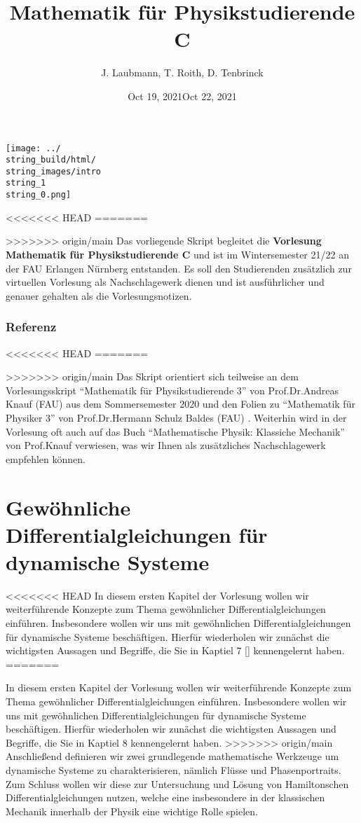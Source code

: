 \documentclass[letterpaper,10pt,english]{jupyterBook}
\title{Mathematik für Physikstudierende C}
\date{Oct 19, 2021}
\date{Oct 22, 2021}
\author{J.\@{} Laubmann, T.\@{} Roith, D.\@{} Tenbrinck}
\begin{document}
\label{\detokenize{intro::doc}}


\noindent\texttt{[image: ../\\string\_build/html/\\string\_images/intro\\string\_1\\string\_0.png]}

<<<<<<< HEAD
=======
\par
>>>>>>> origin/main
Das vorliegende Skript begleitet die \textbf{Vorlesung Mathematik für Physikstudierende C} und ist im Wintersemester 21/22 an der FAU Erlangen Nürnberg entstanden. Es soll den Studierenden zusätzlich zur virtuellen Vorlesung als Nachschlagewerk dienen und ist ausführlicher und genauer gehalten als die Vorlesungsnotizen.

\subsection{Referenz}

<<<<<<< HEAD
=======
\par
>>>>>>> origin/main
Das Skript orientiert sich teilweise an dem Vorlesungsskript “Mathematik für Physikstudierende 3” \cite{Kna20} von Prof.Dr.Andreas Knauf (FAU) aus dem Sommersemester 2020 und den Folien zu “Mathematik für Physiker 3” von Prof.Dr.Hermann Schulz Baldes (FAU) \cite{SB18}. Weiterhin wird in der Vorlesung oft auch auf das Buch “Mathematische Physik: Klassiche Mechanik” \cite{Kna17} von Prof.Knauf verwiesen, was wir Ihnen als zusätzliches Nachschlagewerk empfehlen können.


\chapter{Gewöhnliche Differentialgleichungen für dynamische Systeme}
\label{\detokenize{ode/ode:gewohnliche-differentialgleichungen-fur-dynamische-systeme}}\label{\detokenize{ode/ode::doc}}
<<<<<<< HEAD
In diesem ersten Kapitel der Vorlesung wollen wir weiterführende Konzepte zum Thema gewöhnlicher Differentialgleichungen einführen.
Insbesondere wollen wir uns mit gewöhnlichen Differentialgleichungen für dynamische Systeme beschäftigen.
Hierfür wiederholen wir zunächst die wichtigsten Aussagen und Begriffe, die Sie in Kaptiel 7 {[}{]} kennengelernt haben.
=======
\par
In diesem ersten Kapitel der Vorlesung wollen wir weiterführende Konzepte zum Thema gewöhnlicher Differentialgleichungen einführen.
Insbesondere wollen wir uns mit gewöhnlichen Differentialgleichungen für dynamische Systeme beschäftigen.
Hierfür wiederholen wir zunächst die wichtigsten Aussagen und Begriffe, die Sie in Kaptiel 8 \cite{Ten21} kennengelernt haben.
>>>>>>> origin/main
Anschließend definieren wir zwei grundlegende mathematische Werkzeuge um dynamische Systeme zu charakterisieren, nämlich Flüsse und Phasenportraits.
Zum Schluss wollen wir diese zur Untersuchung und Lösung von Hamiltonschen Differentialgleichungen nutzen, welche eine insbesondere in der klassischen Mechanik innerhalb der Physik eine wichtige Rolle spielen.
\end{document}
